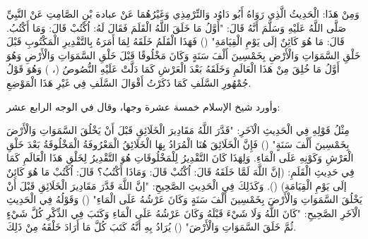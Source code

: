 وَمِنْ هَذَا: الْحَدِيثُ الَّذِي رَوَاهُ أَبُو دَاوُد وَالتِّرْمِذِي وَغَيْرُهُمَا عَنْ عبادة بْنِ الصَّامِتِ عَنْ النَّبِيِّ صَلَّى اللَّهُ عَلَيْهِ وَسَلَّمَ أَنَّهُ قَالَ: "{أَوَّلُ مَا خَلَقَ اللَّهُ الْقَلَمَ فَقَالَ لَهُ: اُكْتُبْ قَالَ: وَمَا أَكْتُبُ. قَالَ: مَا هُوَ كَائِنٌ إلَى يَوْمِ الْقِيَامَةِ}" () فَهَذَا الْقَلَمُ خَلَقَهُ لِمَا أَمَرَهُ بِالتَّقْدِيرِ الْمَكْتُوبِ قَبْلَ خَلْقِ السَّمَوَاتِ وَالْأَرْضِ بِخَمْسِينَ أَلْفَ سَنَةٍ وَكَانَ مَخْلُوقًا قَبْلَ خَلْقِ السَّمَوَاتِ وَالْأَرْضِ وَهُوَ أَوَّلُ مَا خُلِقَ مِنْ هَذَا الْعَالَمِ وَخَلَقَهُ بَعْدَ الْعَرْشِ كَمَا دَلَّتْ عَلَيْهِ النُّصُوصُ (، ) وَهُوَ قَوْلُ جُمْهُورِ السَّلَفِ كَمَا ذَكَرْتُ أَقْوَالَ السَّلَفِ فِي غَيْرِ هَذَا الْمَوْضِعِ.

وأورد شيخ الإسلام خمسة عشرة وجها، وقال في الوجه الرابع عشر: 

مِثْلُ قَوْلِهِ فِي الْحَدِيثِ الْآخَرِ: "{قَدَّرَ اللَّهُ مَقَادِيرَ الْخَلَائِقِ قَبْلَ أَنْ يَخْلُقَ السَّمَوَاتِ وَالْأَرْضَ بِخَمْسِينَ أَلْفَ سَنَةٍ}" () فَإِنَّ الْخَلَائِقَ هُنَا الْمُرَادُ بِهَا الْخَلَائِقُ الْمَعْرُوفَةُ الْمَخْلُوقَةُ بَعْدَ خَلْقِ الْعَرْشِ وَكَوْنِهِ عَلَى الْمَاءِ. وَلِهَذَا كَانَ التَّقْدِيرُ لِلْمَخْلُوقَاتِ هُوَ التَّقْدِيرُ لِخَلْقِ هَذَا الْعَالَمِ كَمَا فِي حَدِيثِ الْقَلَمِ: (إنَّ اللَّهَ لَمَّا خَلَقَهُ قَالَ: اُكْتُبْ قَالَ: وَمَاذَا أَكْتُبُ؟ قَالَ: اُكْتُبْ مَا هُوَ كَائِنٌ إلَى يَوْمِ الْقِيَامَةِ) (). وَكَذَلِكَ فِي الْحَدِيثِ الصَّحِيحِ: "{إنَّ اللَّهَ قَدَّرَ مَقَادِيرَ الْخَلَائِقِ قَبْلَ أَنْ يَخْلُقَ السَّمَوَاتِ وَالْأَرْضَ بِخَمْسِينَ أَلْفَ سَنَةٍ وَكَانَ عَرْشُهُ عَلَى الْمَاءِ}" () وَقَوْلُهُ فِي الْحَدِيثِ الْآخَرِ الصَّحِيحِ: "{كَانَ اللَّهُ وَلَا شَيْءَ قَبْلَهُ وَكَانَ عَرْشُهُ عَلَى الْمَاءِ وَكَتَبَ فِي الذِّكْرِ كُلَّ شَيْءٍ ثُمَّ خَلَقَ السَّمَوَاتِ وَالْأَرْضَ}" () يُرَادُ بِهِ أَنَّهُ كَتَبَ كُلَّ مَا أَرَادَ خَلْقَهُ مِنْ ذَلِكَ.

